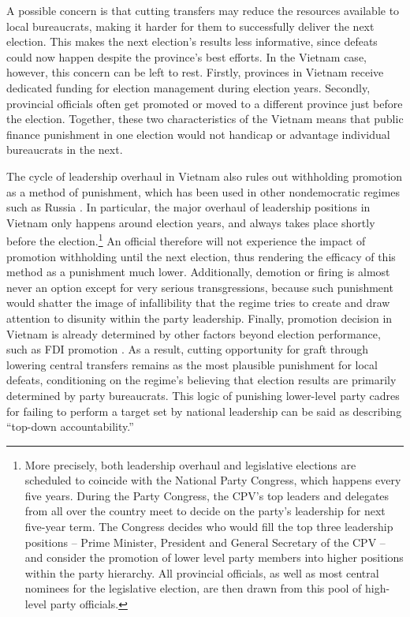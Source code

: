 \documentclass[12pt]{article}\usepackage[]{graphicx}\usepackage[]{color}
\newcommand{\1}{\mathbbm{1}}
\begin{document}
A possible concern is that cutting transfers may reduce the resources available to local bureaucrats, making it harder for them to successfully deliver the next election. This makes the next election's results less informative, since defeats could now happen despite the province's best efforts. In the Vietnam case, however, this concern can be left to rest. Firstly, provinces in Vietnam receive dedicated funding for election management during election years. Secondly, provincial officials often get promoted or moved to a different province just before the election. Together, these two characteristics of the Vietnam means that public finance punishment in one election would not handicap or advantage individual bureaucrats in the next.

The cycle of leadership overhaul in Vietnam also rules out withholding promotion as a method of punishment, which has been used in other nondemocratic regimes such as Russia \citep[][136]{Myagkov2009}. In particular, the major overhaul of leadership positions in Vietnam only happens around election years, and always takes place shortly before the election.\footnote{More precisely, both leadership overhaul and legislative elections are scheduled to coincide with the National Party Congress, which happens every five years. During the Party Congress, the CPV's top leaders and delegates from all over the country meet to decide on the party's leadership for next five-year term. The Congress decides who would fill the top three leadership positions -- Prime Minister, President and General Secretary of the CPV -- and consider the promotion of lower level party members into higher positions within the party hierarchy. All provincial officials, as well as most central nominees for the legislative election, are then drawn from this pool of high-level party officials.} An official therefore will not experience the impact of promotion withholding until the next election, thus rendering the efficacy of this method as a punishment much lower. Additionally, demotion or firing is almost never an option except for very serious transgressions, because such punishment would shatter the image of infallibility that the regime tries to create and draw attention to disunity within the party leadership. Finally, promotion decision in Vietnam is already determined by other factors beyond election performance, such as FDI promotion \citep{JensenMalesky2015}. As a result, cutting opportunity for graft through lowering central transfers remains as the most plausible punishment for local defeats, conditioning on the regime’s believing that election results are primarily determined by party bureaucrats. This logic of punishing lower-level party cadres for failing to perform a target set by national leadership can be said as describing “top-down accountability.”
\end{document}
